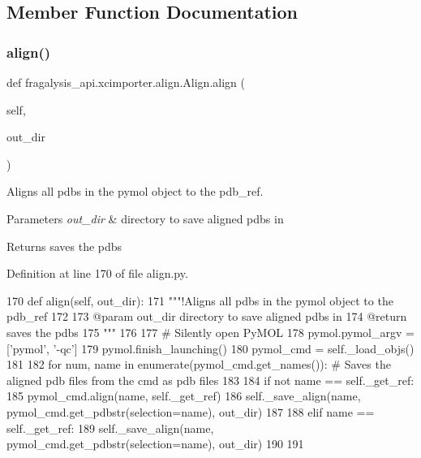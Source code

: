 \subsection{Member Function Documentation}
\mbox{\label{classfragalysis__api_1_1xcimporter_1_1align_1_1_align_a554c8cc5acbc9f5e86bb668c49ea1254}} 
\subsubsection{\texorpdfstring{align()}{align()}}
{\footnotesize\ttfamily def fragalysis\+\_\+api.\+xcimporter.\+align.\+Align.\+align (\begin{DoxyParamCaption}\item[{}]{self,  }\item[{}]{out\+\_\+dir }\end{DoxyParamCaption})}



Aligns all pdbs in the pymol object to the pdb\+\_\+ref. 


\begin{DoxyParams}{Parameters}
{\em out\+\_\+dir} & directory to save aligned pdbs in \\
\hline
\end{DoxyParams}
\begin{DoxyReturn}{Returns}
saves the pdbs 
\end{DoxyReturn}


Definition at line 170 of file align.\+py.


\begin{DoxyCode}
170     \textcolor{keyword}{def }align(self, out\_dir):
171         \textcolor{stringliteral}{"""!Aligns all pdbs in the pymol object to the pdb\_ref}
172 \textcolor{stringliteral}{}
173 \textcolor{stringliteral}{        @param out\_dir directory to save aligned pdbs in}
174 \textcolor{stringliteral}{        @return saves the pdbs}
175 \textcolor{stringliteral}{        """}
176 
177         \textcolor{comment}{# Silently open PyMOL}
178         pymol.pymol\_argv = [\textcolor{stringliteral}{'pymol'}, \textcolor{stringliteral}{'-qc'}]
179         pymol.finish\_launching()
180         pymol\_cmd = self.\_load\_objs()
181 
182         \textcolor{keywordflow}{for} num, name \textcolor{keywordflow}{in} enumerate(pymol\_cmd.get\_names()):  \textcolor{comment}{# Saves the aligned pdb files from the cmd as
       pdb files}
183 
184             \textcolor{keywordflow}{if} \textcolor{keywordflow}{not} name == self.\_get\_ref:
185                 pymol\_cmd.align(name, self.\_get\_ref)
186                 self.\_save\_align(name, pymol\_cmd.get\_pdbstr(selection=name), out\_dir)
187 
188             \textcolor{keywordflow}{elif} name == self.\_get\_ref:
189                 self.\_save\_align(name, pymol\_cmd.get\_pdbstr(selection=name), out\_dir)
190 
191 
\end{DoxyCode}


